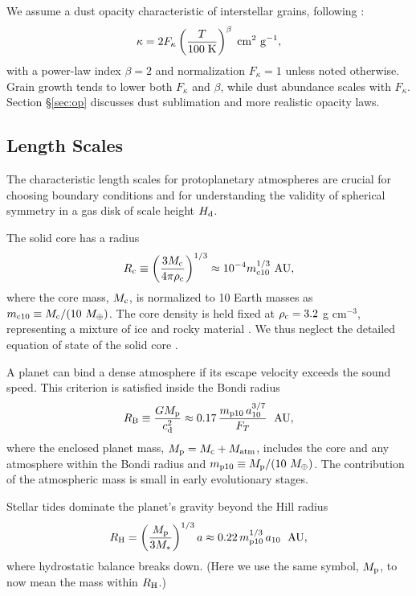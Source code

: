 \documentclass[apj, numberedappendix]{emulateapj}
\newcommand{\AU}{\; {\rm AU}}
\newcommand{\RB}{R_{\rm B}}
\newcommand{\RH}{R_{\rm H}}
\newcommand{\co}{_{\rm c}}
\newcommand{\pla}{_{\rm p}}
\newcommand{\di}{_{\rm d}}
\newcommand{\mcn}[1] { m_{ \rm c #1} }
\newcommand{\mpn}[1] { m_{ \rm p #1} }
\newcommand{\aun}[1]{ a_{#1} }
\begin{document}
We assume a dust opacity characteristic of interstellar grains, following \citet{bell94}:
\begin{equation}
\label{eq:opacitylaw}
\kappa= 2 F_\kappa  \left(\frac{T}{100\; \rm{K}}\right)^{\beta} \; \mathrm{cm^2 ~ g^{-1}},
\end{equation}
with a power-law index $\beta = 2$ and normalization $F_\kappa = 1$ unless noted otherwise. Grain growth tends to lower both $F_\kappa$ and $\beta$, while dust abundance scales with $F_\kappa$.   Section \S\ref{sec:op} discusses dust sublimation and more realistic opacity laws.


\subsection{Length Scales}
\label{sec:scales}

The characteristic length scales for protoplanetary atmospheres are crucial for choosing boundary conditions and for understanding the validity of  spherical symmetry in a gas disk of scale height $H\di$.

The solid core has a radius
\begin{equation}
\label{eq:rc}
R\co \equiv \left(\frac{3 M\co}{4 \pi \rho\co}\right)^{1/3} \approx 10^{-4} \mcn{10}^{1/3} ~\text{AU},
\end{equation}
where the core mass, $M\co$, is normalized to 10 Earth masses as $\mcn{10} \equiv M\co/(10~M_\oplus)$. The core density is held fixed at $\rho\co=3.2$ g cm$^{-3}$, representing a mixture of ice and rocky material \citep{pap99}.  We thus neglect  the detailed equation of state of the solid core \citep{fortney07}.

A planet can bind a dense atmosphere if its escape velocity exceeds the sound speed.  This criterion is satisfied inside the Bondi radius
\begin{equation}
\label{eq:RB}
\RB \equiv \frac{G M\pla}{c\di^2} \approx 0.17 \, {\mpn{10}  \, \aun{10}^{3/7} \over F_T} ~\AU,
\end{equation}
where the enclosed planet mass, $M\pla = M\co + M_\mathrm{atm}$, includes the core and any atmosphere within the Bondi radius and $\mpn{10} \equiv M\pla /(10~M_\oplus)$.   The contribution of the atmospheric mass is small in early evolutionary stages.

Stellar tides dominate the planet's gravity beyond the Hill radius
\begin{equation}
\label{eq:RHill}
R_{\rm H} = \left(M\pla \over 3 M_\ast \right)^{1/3}a \approx 0.22 \, {\mpn{10}^{1/3} \, \aun{10} }~\AU ,
\end{equation}
where hydrostatic balance breaks down.  (Here we use the same symbol, $M\pla$, to now mean the mass within $\RH$.) 
\end{document}
